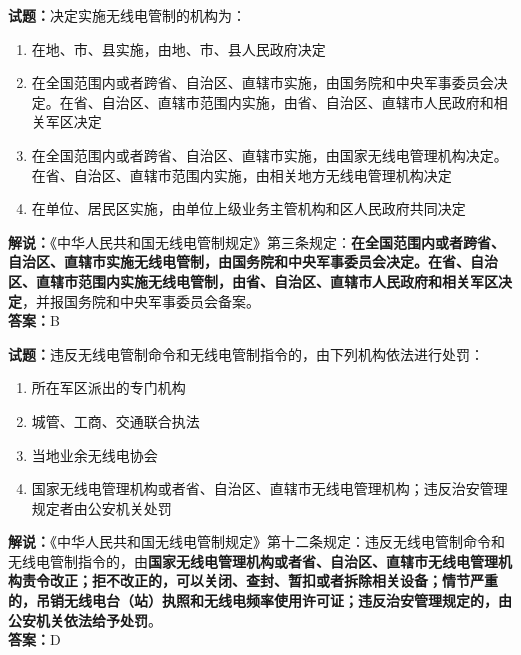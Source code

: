 \documentclass{ctexbook}
\begin{document}
\bigskip


\noindent\textbf{试题：}决定实施无线电管制的机构为：
\begin{enumerate}[leftmargin=3em]
\item 在地、市、县实施，由地、市、县人民政府决定
\item 在全国范围内或者跨省、自治区、直辖市实施，由国务院和中央军事委员会决定。在省、自治区、直辖市范围内实施，由省、自治区、直辖市人民政府和相关军区决定
\item 在全国范围内或者跨省、自治区、直辖市实施，由国家无线电管理机构决定。在省、自治区、直辖市范围内实施，由相关地方无线电管理机构决定
\item 在单位、居民区实施，由单位上级业务主管机构和区人民政府共同决定
\end{enumerate}
\noindent\textbf{解说：}《中华人民共和国无线电管制规定》第三条规定：\textbf{在全国范围内或者跨省、自治区、直辖市实施无线电管制，由国务院和中央军事委员会决定。在省、自治区、直辖市范围内实施无线电管制，由省、自治区、直辖市人民政府和相关军区决定}，并报国务院和中央军事委员会备案。\\\noindent\textbf{答案：}B



\bigskip


\noindent\textbf{试题：}违反无线电管制命令和无线电管制指令的，由下列机构依法进行处罚：
\begin{enumerate}[leftmargin=3em]
\item 所在军区派出的专门机构
\item 城管、工商、交通联合执法
\item 当地业余无线电协会
\item 国家无线电管理机构或者省、自治区、直辖市无线电管理机构；违反治安管理规定者由公安机关处罚
\end{enumerate}
\noindent\textbf{解说：}《中华人民共和国无线电管制规定》第十二条规定：违反无线电管制命令和无线电管制指令的，由\textbf{国家无线电管理机构或者省、自治区、直辖市无线电管理机构责令改正；拒不改正的，可以关闭、查封、暂扣或者拆除相关设备；情节严重的，吊销无线电台（站）执照和无线电频率使用许可证；违反治安管理规定的，由公安机关依法给予处罚}。\\\noindent\textbf{答案：}D



\bigskip
\end{document}
